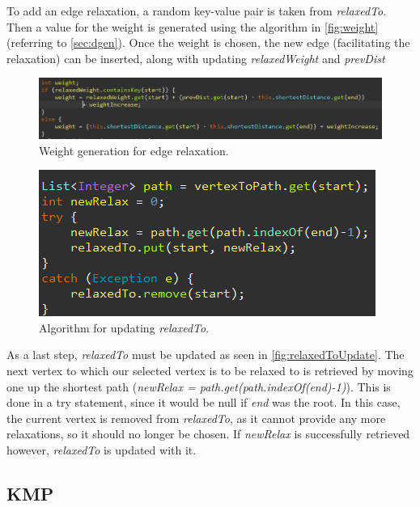 \documentclass{l4proj}
\begin{document}
To add an edge relaxation, a random key-value pair is taken from \emph{relaxedTo}. Then a value for the weight is generated using the algorithm in \autoref{fig:weight} (referring to \autoref{sec:dgen}). Once the weight is chosen, the new edge (facilitating the relaxation) can be inserted, along with updating \emph{relaxedWeight} and \emph{prevDist}

\begin{figure}
    \centering
    \includegraphics[width=0.99\linewidth]{images/weight.png}    

    \caption{Weight generation for edge relaxation.}
    \label{fig:weight} 
\end{figure}

\begin{figure}
    \centering
    \includegraphics[width=0.7\linewidth]{images/relaxedToUpdate.png}    

    \caption{Algorithm for updating \emph{relaxedTo}.}
    \label{fig:relaxedToUpdate} 
\end{figure}

As a last step, \emph{relaxedTo} must be updated as seen in \autoref{fig:relaxedToUpdate}. The next vertex to which our selected vertex is to be relaxed to is retrieved by moving one up the shortest path (\emph{newRelax = path.get(path.indexOf(end)-1)}). This is done in a try statement, since it would be null if \emph{end} was the root. In this case, the current vertex is removed from \emph{relaxedTo}, as it cannot provide any more relaxations, so it should no longer be chosen. If \emph{newRelax} is successfully retrieved however, \emph{relaxedTo} is updated with it.

\subsection{KMP}
\end{document}
